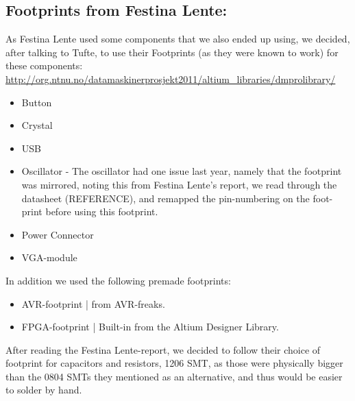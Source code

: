 \subsection{Footprints from Festina Lente:}
As Festina Lente used some components that we also ended up using, we decided,
after talking to Tufte, to use their Footprints (as they were known to work) 
for these components:
\url{http://org.ntnu.no/datamaskinerprosjekt2011/altium_libraries/dmprolibrary/}
\begin{itemize}
\item Button
\item Crystal
\item USB
\item Oscillator - The oscillator had one issue last year, namely that the
  footprint was mirrored, noting this from Festina Lente's report, we read
  through the datasheet (REFERENCE), and remapped the
  pin-numbering on the foot-print before using this footprint.
\item Power Connector
\item VGA-module
\end{itemize}

In addition we used the following premade footprints:
\begin{itemize}
\item AVR-footprint | from AVR-freaks.
\item FPGA-footprint | Built-in from the Altium Designer Library.
\end{itemize}

After reading the Festina Lente-report, we decided to follow their
choice of footprint for capacitors and resistors, 1206 SMT, as those were physically bigger
than the 0804 SMTs they mentioned as an alternative, and thus would be easier to solder by hand.
